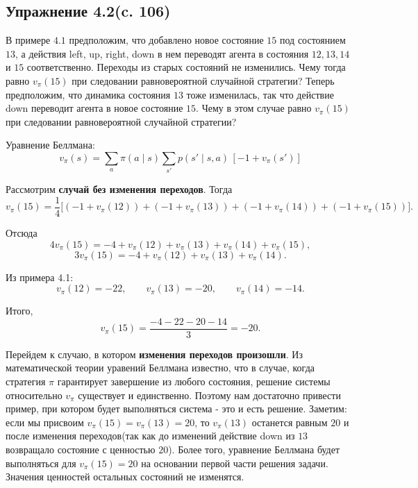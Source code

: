 \subsection{Упражнение 4.2(c. 106)}
В примере $4.1$ предположим, что добавлено новое состояние $15$ под состоянием $13$, а действия left, up, right, down в нем переводят агента в состояния $12, 13, 14$ и $15$ соответственно. Переходы из старых состояний не изменились.
Чему тогда равно $v_{\pi}(15)$ при следовании равновероятной случайной стратегии? Теперь предположим, что динамика состояния $13$ тоже изменилась, так что действие down переводит агента в новое состояние $15$. Чему в этом случае равно $v_{\pi}(15)$ при следовании равновероятной случайной стратегии? 
\begin{solution}
    Уравнение Беллмана:
    \[
    v_{\pi}(s)=\sum_a \pi(a\mid s)
    \sum_{s'} p(s'\mid s,a)\,[ -1 + v_{\pi}(s') ]
    \]
    
    Рассмотрим \textbf{случай без изменения переходов}. Тогда
    \[
    v_{\pi}(15)
    =\frac14\Big[
    (-1+v_{\pi}(12))
    +(-1+v_{\pi}(13))
    +(-1+v_{\pi}(14))
    +(-1+v_{\pi}(15))
    \Big].
    \]
    
    Отсюда
    \[
    4v_{\pi}(15)
    =
    -4+v_{\pi}(12)+v_{\pi}(13)+v_{\pi}(14)+v_{\pi}(15),
    \]
    \[
    3v_{\pi}(15)
    =
    -4+v_{\pi}(12)+v_{\pi}(13)+v_{\pi}(14).
    \]
    
    Из примера 4.1:
    \[
    v_{\pi}(12)=-22,\qquad
    v_{\pi}(13)=-20,\qquad
    v_{\pi}(14)=-14.
    \]
    
    Итого,
    \[
    v_{\pi}(15)
    =\frac{-4-22-20-14}{3}
    =-20.
    \]

    Перейдем к случаю, в котором \textbf{изменения переходов произошли}. Из математической теории уравений Беллмана известно, что в случае, когда стратегия $\pi$ гарантирует завершение из любого состояния, решение системы относительно $v_{\pi}$ существует и единственно. Поэтому нам достаточно привести пример, при котором будет выполняться система - это и есть решение. Заметим: если мы присвоим $v_{\pi}(15) = v_{\pi}(13) = 20$, то  $v_{\pi}(13)$ останется равным $20$ и после изменения переходов(так как до изменений действие down из $13$ возвращало состояние с ценностью $20$). Более того, уравнение Беллмана будет выполняться для $v_{\pi}(15) = 20$ на основании первой части решения задачи. Значения ценностей остальных состояний не изменятся.
\end{solution}

